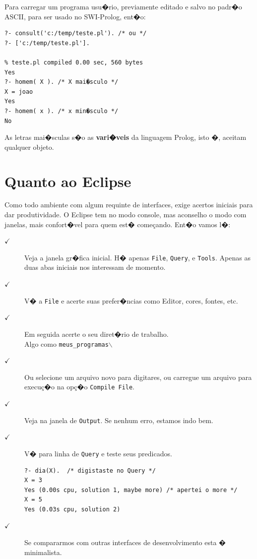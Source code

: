 \documentclass[final,a4paper]{article}
\begin{document}
Para carregar um programa usu�rio, previamente editado  e salvo no padr�o ASCII, para ser usado no SWI-Prolog, ent�o:
\begin{verbatim}
?- consult('c:/temp/teste.pl'). /* ou */
?- ['c:/temp/teste.pl'].

% teste.pl compiled 0.00 sec, 560 bytes
Yes
?- homem( X ). /* X mai�sculo */
X = joao
Yes
?- homem( x ). /* x min�sculo */
No
\end{verbatim}

 As letras mai�sculas s�o as {\bf vari�veis} da linguagem
Prolog, isto �, aceitam qualquer objeto.


\section{Quanto ao Eclipse}

Como todo ambiente  com algum requinte de interfaces, exige acertos
iniciais para dar produtividade. O Eclipse tem no modo console,
mas aconselho o modo com janelas, mais confort�vel para quem est�
come\c{c}ando. Ent�o vamos l�:

\begin{description}

\item [$\checkmark $] Veja a janela gr�fica inicial. H� apenas \texttt{File},
\texttt{Query}, e \texttt{Tools}. Apenas as duas abas iniciais nos interessam de momento.

\item [$\checkmark $] V� a \texttt{File} e acerte suas prefer�ncias como Editor, cores, fontes, etc.

\item [$\checkmark $] Em seguida acerte o seu diret�rio de trabalho.\\ Algo como
\texttt{meus\_programas$\backslash$ }

\item [$\checkmark $] Ou selecione um arquivo novo para digitares, ou carregue
um arquivo para execu\c{c}�o na op\c{c}�o \texttt{Compile File}.

\item [$\checkmark $] Veja na janela de \texttt{Output}. Se nenhum erro, estamos indo bem.

\item [$\checkmark $] V� para linha de \texttt{Query} e teste seus predicados.
{\small
\begin{verbatim} 
?- dia(X).  /* digistaste no Query */
X = 3
Yes (0.00s cpu, solution 1, maybe more) /* apertei o more */
X = 5
Yes (0.03s cpu, solution 2)
\end{verbatim}
}

\item [$\checkmark $] Se compararmos com outras interfaces de desenvolvimento
esta � minimalista.

\end{description}
 
\end{document}

